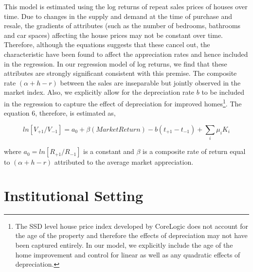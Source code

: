 \documentclass[AEJ,reqno, draftmode]{AEA} %
\begin{document}
This model is estimated using the log returns of repeat sales prices of houses over time. Due to changes in the supply and demand at the time of purchase and resale, the gradients of attributes (such as the number of bedrooms, bathrooms and car spaces) affecting the house prices may not be constant over time. Therefore, although the equations suggests that these cancel out, the characteristic have been found to affect the appreciation rates \citep{kiel1995effect} and hence included in the regression. In our regression model of log returns, we find that these attributes are strongly significant consistent with this premise. The composite rate $(\alpha+h-r)$ between the sales are inseparable but jointly observed in the market index. Also, we explicitly allow for the depreciation rate $b$ to be included in the regression to capture the effect of depreciation for improved homes\footnote{The SSD level house price index developed by CoreLogic does not account for the age of the property and therefore the effects of depreciation may not have been captured entirely. In our model, we explicitly include the age of the home improvement and control for linear as well as any quadratic effects of depreciation.}. The equation 6, therefore, is estimated as,

\begin{equation} \label{eq:estimate}
    ln[V_{+1}/V_{-1}] = a_0 + \beta{(Market Return)} - b(t_{+1}-t_{-1}) + \sum_{i}\mu_i K_i
\end{equation}

where $a_0 = ln[R_{+1}/R_{-1}]$ is a constant and $\beta$ is a composite rate of return equal to $(\alpha+h-r)$ attributed to the average market appreciation.


\section{Institutional Setting}
\end{document}
